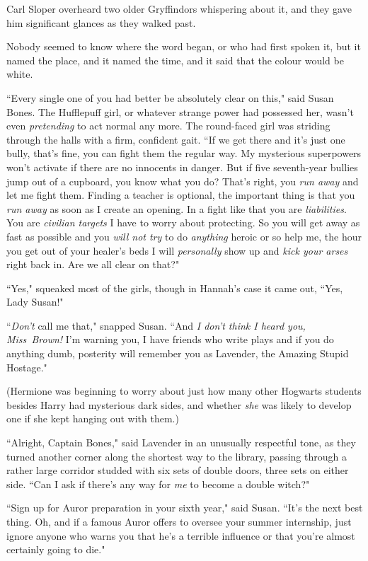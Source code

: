 Carl Sloper overheard two older Gryffindors whispering about it, and they gave him significant glances as they walked past.

Nobody seemed to know where the word began, or who had first spoken it, but it named the place, and it named the time, and it said that the colour would be white.

\later

``Every single one of you had better be absolutely clear on this," said Susan Bones. The Hufflepuff girl, or whatever strange power had possessed her, wasn't even \emph{pretending} to act normal any more. The round-faced girl was striding through the halls with a firm, confident gait. ``If we get there and it's just one bully, that's fine, you can fight them the regular way. My mysterious superpowers won't activate if there are no innocents in danger. But if five seventh-year bullies jump out of a cupboard, you know what you do? That's right, you \emph{run away} and let me fight them. Finding a teacher is optional, the important thing is that you \emph{run away} as soon as I create an opening. In a fight like that you are \emph{liabilities}. You are \emph{civilian targets} I have to worry about protecting. So you will get away as fast as possible and you \emph{will not try} to do \emph{anything} heroic or so help me, the hour you get out of your healer's beds I will \emph{personally} show up and \emph{kick your arses} right back in. Are we all clear on that?"

``Yes," squeaked most of the girls, though in Hannah's case it came out, ``Yes, Lady Susan!"

``\emph{Don't} call me that," snapped Susan. ``And \emph{I don't think I heard you, Miss~Brown!} I'm warning you, I have friends who write plays and if you do anything dumb, posterity will remember you as Lavender, the Amazing Stupid Hostage."

(Hermione was beginning to worry about just how many other Hogwarts students besides Harry had mysterious dark sides, and whether \emph{she} was likely to develop one if she kept hanging out with them.)

``Alright, Captain Bones," said Lavender in an unusually respectful tone, as they turned another corner along the shortest way to the library, passing through a rather large corridor studded with six sets of double doors, three sets on either side. ``Can I ask if there's any way for \emph{me} to become a double witch?"

``Sign up for Auror preparation in your sixth year," said Susan. ``It's the next best thing. Oh, and if a famous Auror offers to oversee your summer internship, just ignore anyone who warns you that he's a terrible influence or that you're almost certainly going to die."

